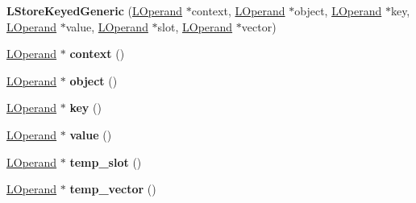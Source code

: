 \begin{DoxyCompactItemize}
\item 
{\bfseries L\+Store\+Keyed\+Generic} (\hyperlink{classv8_1_1internal_1_1_l_operand}{L\+Operand} $\ast$context, \hyperlink{classv8_1_1internal_1_1_l_operand}{L\+Operand} $\ast$object, \hyperlink{classv8_1_1internal_1_1_l_operand}{L\+Operand} $\ast$key, \hyperlink{classv8_1_1internal_1_1_l_operand}{L\+Operand} $\ast$value, \hyperlink{classv8_1_1internal_1_1_l_operand}{L\+Operand} $\ast$slot, \hyperlink{classv8_1_1internal_1_1_l_operand}{L\+Operand} $\ast$vector)\hypertarget{classv8_1_1internal_1_1_l_store_keyed_generic_af091880976ae47ab5668f689b739343e}{}\label{classv8_1_1internal_1_1_l_store_keyed_generic_af091880976ae47ab5668f689b739343e}

\item 
\hyperlink{classv8_1_1internal_1_1_l_operand}{L\+Operand} $\ast$ {\bfseries context} ()\hypertarget{classv8_1_1internal_1_1_l_store_keyed_generic_a4f167d2748fbfa19937cabab260ea080}{}\label{classv8_1_1internal_1_1_l_store_keyed_generic_a4f167d2748fbfa19937cabab260ea080}

\item 
\hyperlink{classv8_1_1internal_1_1_l_operand}{L\+Operand} $\ast$ {\bfseries object} ()\hypertarget{classv8_1_1internal_1_1_l_store_keyed_generic_af1106ab73c930b73c937d138a3b68d6e}{}\label{classv8_1_1internal_1_1_l_store_keyed_generic_af1106ab73c930b73c937d138a3b68d6e}

\item 
\hyperlink{classv8_1_1internal_1_1_l_operand}{L\+Operand} $\ast$ {\bfseries key} ()\hypertarget{classv8_1_1internal_1_1_l_store_keyed_generic_a8e5ab828ddbab917cc744e7c6022259d}{}\label{classv8_1_1internal_1_1_l_store_keyed_generic_a8e5ab828ddbab917cc744e7c6022259d}

\item 
\hyperlink{classv8_1_1internal_1_1_l_operand}{L\+Operand} $\ast$ {\bfseries value} ()\hypertarget{classv8_1_1internal_1_1_l_store_keyed_generic_ae0648fd1acbfca9be9ecd39a179ebb13}{}\label{classv8_1_1internal_1_1_l_store_keyed_generic_ae0648fd1acbfca9be9ecd39a179ebb13}

\item 
\hyperlink{classv8_1_1internal_1_1_l_operand}{L\+Operand} $\ast$ {\bfseries temp\+\_\+slot} ()\hypertarget{classv8_1_1internal_1_1_l_store_keyed_generic_a2badce4286c0f26664dbddd0e2b29846}{}\label{classv8_1_1internal_1_1_l_store_keyed_generic_a2badce4286c0f26664dbddd0e2b29846}

\item 
\hyperlink{classv8_1_1internal_1_1_l_operand}{L\+Operand} $\ast$ {\bfseries temp\+\_\+vector} ()\hypertarget{classv8_1_1internal_1_1_l_store_keyed_generic_a8e332b61e68443ed2a912b79cbf01438}{}\label{classv8_1_1internal_1_1_l_store_keyed_generic_a8e332b61e68443ed2a912b79cbf01438}


\end{DoxyCompactItemize}
